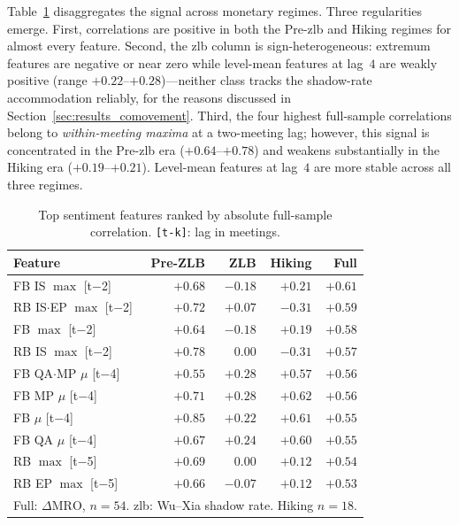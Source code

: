 Table~\ref{tab:summary} disaggregates the signal across monetary regimes. Three regularities emerge. First, correlations are positive in both the Pre-\gls{zlb} and Hiking regimes for almost every feature. Second, the \gls{zlb} column is sign-heterogeneous: extremum features are negative or near zero while level-mean features at lag~$4$ are weakly positive (range $+0.22$--$+0.28$)---neither class tracks the shadow-rate accommodation reliably, for the reasons discussed in Section~\ref{sec:results_comovement}. Third, the four highest full-sample correlations belong to \emph{within-meeting maxima} at a two-meeting lag; however, this signal is concentrated in the Pre-\gls{zlb} era ($+0.64$--$+0.78$) and weakens substantially in the Hiking era ($+0.19$--$+0.21$). Level-mean features at lag~$4$ are more stable across all three regimes.

\begin{table}[htpb]
    \centering
    \caption[Top sentiment features by absolute predictive correlation]{Top sentiment features ranked by absolute full-sample correlation. \texttt{[t-k]}: lag in meetings.}
    \label{tab:summary}
    \begin{tabular}{@{}lrrrr@{}}
        \toprule
        \textbf{Feature}              & \textbf{Pre-ZLB} & \textbf{ZLB}      & \textbf{Hiking} & \textbf{Full} \\ \midrule
        FB IS $\max$ [t$-$2]          & $+0.68$          & $-0.18$           & $+0.21$         & $+0.61$       \\
        RB IS$\cdot$EP $\max$ [t$-$2] & $+0.72$          & $+0.07$           & $-0.31$         & $+0.59$       \\
        FB $\max$ [t$-$2]             & $+0.64$          & $-0.18$           & $+0.19$         & $+0.58$       \\
        RB IS $\max$ [t$-$2]          & $+0.78$          & $\phantom{+}0.00$ & $-0.31$         & $+0.57$       \\
        FB QA$\cdot$MP $\mu$ [t$-$4]  & $+0.55$          & $+0.28$           & $+0.57$         & $+0.56$       \\
        FB MP $\mu$ [t$-$4]           & $+0.71$          & $+0.28$           & $+0.62$         & $+0.56$       \\
        FB $\mu$ [t$-$4]              & $+0.85$          & $+0.22$           & $+0.61$         & $+0.55$       \\
        FB QA $\mu$ [t$-$4]           & $+0.67$          & $+0.24$           & $+0.60$         & $+0.55$       \\
        RB $\max$ [t$-$5]             & $+0.69$          & $\phantom{+}0.00$ & $+0.12$         & $+0.54$       \\
        RB EP $\max$ [t$-$5]          & $+0.66$          & $-0.07$           & $+0.12$         & $+0.53$       \\
        \bottomrule
        \multicolumn{5}{l}{\footnotesize Full: $\Delta\text{MRO}$, $n=54$. \gls{zlb}: Wu--Xia shadow rate. Hiking $n=18$.}
    \end{tabular}
\end{table}

